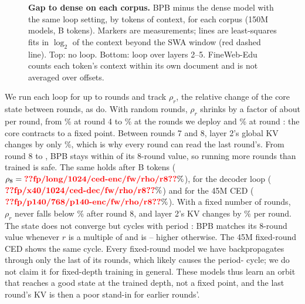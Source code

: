 \begin{figure}[t]
\centering
{}
\caption{\textbf{Gap to dense on each corpus.} BPB minus the dense model with the same loop setting, by tokens of
context, for each corpus (150M
models, B tokens). Markers are measurements; lines are least-squares fits in $\log_2$ of
the context beyond the SWA window (red dashed line). Top: no loop. Bottom: loop over layers 2--5. FineWeb-Edu counts
each token's context within its own document and is not averaged over offsets.}
\label{fig:longctx-corpora}
\end{figure}

We run each loop for up to  rounds and track $\rho_r$, the relative change of the core state
between rounds, as \citet{benice} do. With random rounds, $\rho_r$ shrinks by a factor of about
 per round, from \% at round 4 to
\% at the  rounds we deploy and
\% at round : the core contracts to a fixed point. Between
rounds 7 and 8, layer 2's global KV changes by only \%, which is why every
round can read the last round's. From round 8 to , BPB stays within
 of its 8-round value, so running more rounds than trained is safe. The
same holds after B tokens ($\rho_8 = \val{fp/long/1024/ced-enc/fw/rho/r8}\%$), for the decoder
loop ($\val{fp/x40/1024/ced-dec/fw/rho/r8}\%$) and for the 45M CED ($\val{fp/p140/768/p140-enc/fw/rho/r8}\%$). With
a fixed number of rounds, $\rho_r$ never falls below \% after round
8, and layer 2's KV changes by \% per round. The state does not
converge but cycles with period : BPB matches its 8-round value whenever
$r$ is a multiple of  and is
-- higher otherwise. The
45M fixed-round CED shows the same cycle. Every fixed-round model we have backpropagates through only the last
 of its  rounds, which likely causes the period-
cycle; we do not claim it for fixed-depth training in general. These models thus learn an orbit that reaches a
good state at the trained depth, not a fixed point, and the last round's KV is then a poor stand-in for earlier rounds'.

